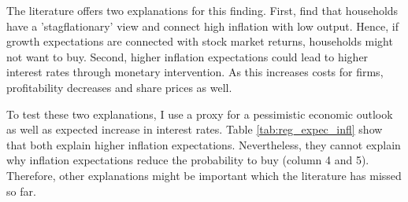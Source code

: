 \documentclass[ProjectABM]{subfiles}
\begin{document}





The literature offers two explanations for this finding. First, \cite{CCG_2020_inflation_communication} find that households have a 'stagflationary' view and connect high inflation with low output. Hence, if growth expectations are connected with stock market returns, households might not want to buy. Second, higher inflation expectations could lead to higher interest rates through monetary intervention. As this increases costs for firms, profitability decreases and share prices as well. 

To test these two explanations, I use a proxy for a pessimistic economic outlook as well as expected increase in interest rates. Table \ref{tab:reg_expec_infl} show that both explain higher inflation expectations. Nevertheless, they cannot explain why inflation expectations reduce the probability to buy (column 4 and 5). Therefore, other explanations might be important which the literature has missed so far.



\end{document}
